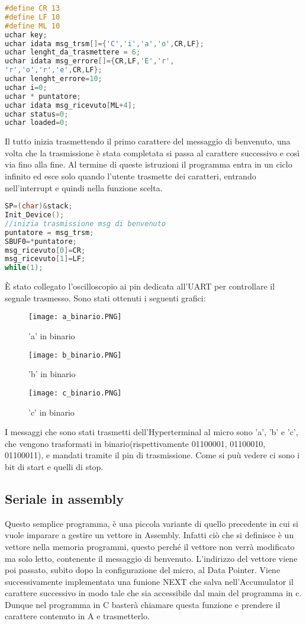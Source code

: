 \documentclass[main.tex]{subfiles}
\begin{document}
\begin{lstlisting}[language=C, caption=Variabili globali]
#define CR 13
#define LF 10
#define ML 10
uchar key;
uchar idata msg_trsm[]={'C','i','a','o',CR,LF};
uchar lenght_da_trasmettere = 6;
uchar idata msg_errore[]={CR,LF,'E','r',
'r','o','r','e',CR,LF};
uchar lenght_errore=10;
uchar i=0;
uchar * puntatore;
uchar idata msg_ricevuto[ML+4];
uchar status=0;
uchar loaded=0;
\end{lstlisting}
Il tutto inizia trasmettendo il primo carattere del messaggio di benvenuto, una volta che la trasmissione è stata completata si passa al carattere successivo e così via fino alla fine.
Al termine di queste istruzioni il programma entra in un ciclo infinito ed esce solo quando l'utente trasmette dei caratteri, entrando nell'interrupt e quindi nella funzione scelta. 
\begin{lstlisting}[language=C, caption=main]
SP=(char)&stack;
Init_Device();
//inizia trasmissione msg di benvenuto
puntatore = msg_trsm; 
SBUF0=*puntatore;
msg_ricevuto[0]=CR;
msg_ricevuto[1]=LF;
while(1);
\end{lstlisting}
È stato collegato l'oscilloscopio ai pin dedicata all'UART per controllare il segnale trasmesso. Sono stati ottenuti i seguenti grafici:
\begin{figure}[H]
    \centering
    \texttt{[image: a\_binario.PNG]}
    \caption{'a' in binario}
    \label{fig:a}
\end{figure}
\begin{figure}[H]
    \centering
    \texttt{[image: b\_binario.PNG]}
    \caption{'b' in binario}
    \label{fig:b}
\end{figure}
\begin{figure}[H]
    \centering
    \texttt{[image: c\_binario.PNG]}
    \caption{'c' in binario}
    \label{fig:c}
\end{figure}
I messaggi che sono stati trasmetti dell'Hyperterminal al micro sono 'a', 'b' e 'c', che vengono trasformati in binario(rispettivamente 01100001, 01100010, 01100011), e mandati tramite il pin di trasmissione. Come si puù vedere ci sono i bit di start e quelli di stop.

\subsection{Seriale in assembly}

Questo semplice programma, è una piccola variante di quello precedente in cui si vuole imparare a gestire un vettore in Assembly. Infatti ciò che si definisce è un vettore nella memoria programmi, questo perché il vettore non verrà modificato ma solo letto, contenente il messaggio di benvenuto. L'indirizzo del vettore viene poi passato, subito dopo la configurazione del micro, al Data Pointer. Viene successivamente implementata una funione NEXT che salva nell'Accumulator il carattere successivo in modo tale che sia accessibile dal main del programma in c. Dunque nel programma in C basterà chiamare questa funzione e prendere il carattere contenuto in A e trasmetterlo. 
\end{document}
